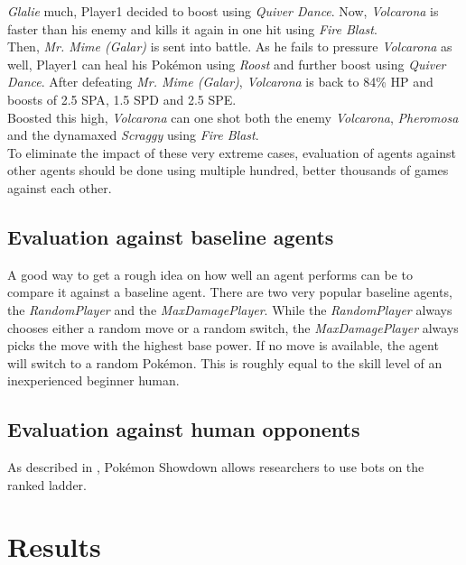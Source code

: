 \textit{Glalie} much, Player1 decided to boost using \textit{Quiver Dance}. Now, \textit{Volcarona}
is faster than his enemy and kills it again in one hit using \textit{Fire Blast}. \\
Then, \textit{Mr. Mime (Galar)} is sent into battle. As he fails to pressure \textit{Volcarona} as well,
Player1 can heal his Pokémon using \textit{Roost} and further boost using \textit{Quiver Dance}. After
defeating \textit{Mr. Mime (Galar)}, \textit{Volcarona} is back to 84\% HP and boosts of 2.5 \ac{SPA},
1.5 \ac{SPD} and 2.5 \ac{SPE}. \\
Boosted this high, \textit{Volcarona} can one shot both the enemy \textit{Volcarona},
\textit{Pheromosa} and the dynamaxed \textit{Scraggy} using \textit{Fire Blast}. \\
To eliminate the impact of these very extreme cases, evaluation of agents against other agents 
should be done using multiple hundred, better thousands of games against each other.

\subsection{Evaluation against baseline agents}
\label{sec:eval-challenges-baseline}
A good way to get a rough idea on how well an agent performs can be to compare it against a baseline agent.
There are two very popular baseline agents, the \textit{RandomPlayer} and the \textit{MaxDamagePlayer}.
While the \textit{RandomPlayer} always chooses either a random move or a random switch, the \textit{MaxDamagePlayer}
always picks the move with the highest base power. If no move is available, the agent will switch to a random 
Pokémon. This is roughly equal to the skill level of an inexperienced beginner human. 

\subsection{Evaluation against human opponents}
As described in , Pokémon Showdown allows researchers to use bots on the
ranked ladder. 

\section{Results}
